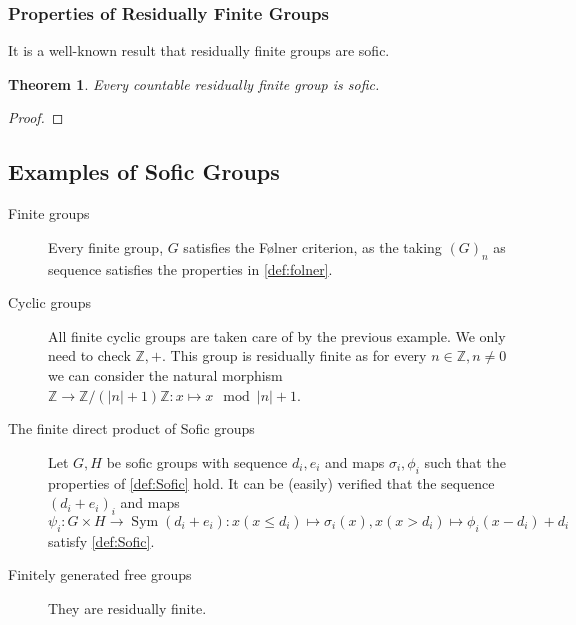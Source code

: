 \documentclass[titlepage, a4paper]{article}
\newcommand{\Z}{\mathbb{Z}}
\DeclareMathOperator{\sym}{Sym}
\newtheorem{theorem}{Theorem}[section]
\theoremstyle{remark}
\begin{document}


\subsubsection{Properties of Residually Finite Groups}

It is a well-known result that residually finite groups are sofic. %

    \begin{theorem} \label{thm:res_fin_sofic}
        Every countable residually finite group is sofic.
    \end{theorem}
    \begin{proof}
        
    \end{proof}

    \subsection{Examples of Sofic Groups}


    \begin{description}
        \item[Finite groups] Every finite group, $G$ satisfies the Følner criterion, as the taking $(G)_n$ as sequence satisfies the properties in \cref{def:folner}.
        \item[Cyclic groups] All finite cyclic groups are taken care of by the previous example. We only need to check $\Z,+$. This group is residually finite as for every $n \in \Z, n \ne 0$ we can consider the natural morphism $\Z \to \Z /(|n|+1)\Z: x \mapsto x \mod |n|+1$. 
        \item[The finite direct product of Sofic groups] Let $G, H$ be sofic groups with sequence $d_i, e_i$ and maps $\sigma_i, \phi_i$ such that the properties of \cref{def:Sofic} hold. It can be (easily) verified that the sequence $(d_i + e_i)_i$ and maps $\psi_i: G \times H \to \sym(d_i + e_i): x (x \le d_i) \mapsto \sigma_i(x), x (x > d_i) \mapsto \phi_i(x -d_i) + d_i$ satisfy \cref{def:Sofic}.
        \item[Finitely generated free groups] They are residually finite.
    \end{description}

 
\end{document}
